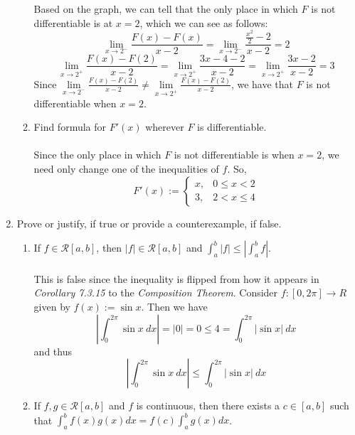 \documentclass[12pt,letterpaper]{article}
\newcommand{\limx}[2]{\displaystyle\lim\limits_{#1 \to #2}}
\newcommand{\abs}[1]{\left\lvert #1 \right\rvert}
\theoremstyle{case}
\theoremstyle{definition}
\begin{document}
\begin{enumerate}
\begin{enumerate}
			\\\\Based on the graph, we can tell that the only place in which $F$ is not differentiable is at $x=2$, which we can see as follows:
			\[\limx{x}{2^-} \frac{F(x)-F(x)}{x-2} = \limx{x}{2^-} \frac{\frac{x^2}{2}-2}{x-2}=2\]
			\[\limx{x}{2^+}\frac{F(x)-F(2)}{x-2}=\limx{x}{2^+} \frac{3x-4-2}{x-2}=\limx{x}{2^+} \frac{3x-2}{x-2} = 3\]
			Since $\limx{x}{2^-} \frac{F(x)-F(2)}{x-2} \neq \limx{x}{2^+} \frac{F(x)-F(2)}{x-2}$, we have that $F$ is not differentiable when $x=2$.\\
			\item Find formula for $F'(x)$ wherever $F$ is differentiable.
			\\\\Since the only place in which $F$ is not differentiable is when $x=2$, we need only change one of the inequalities of $f$. So,
			\[F'(x):=\begin{cases}
			x, &0 \leq x < 2 \\
			3, &2<x\leq 4
			\end{cases}\]
		\end{enumerate}
		\item Prove or justify, if true or provide a counterexample, if false.
		\begin{enumerate}
			\item If $f \in \mathcal{R}[a,b]$, then $|f| \in \mathcal{R}[a,b]$ and $\displaystyle\int_{a}^{b} |f| \leq \abs{\int_{a}^{b}f}$.
			\\\\This is false since the inequality is flipped from how it appears in \textit{Corollary 7.3.15} to the \textit{Composition Theorem}. Consider $f:[0,2\pi] \to R$ given by $f(x):=\sin x$. Then we have
			\[\abs{\int_{0}^{2\pi} \sin x\ dx} = \abs{0} = 0 \leq 4=\int_{0}^{2\pi} \abs{\sin x}\ dx\]
			and thus
			\[\abs{\int_{0}^{2\pi} \sin x\ dx} \leq \int_{0}^{2\pi} \abs{\sin x}\ dx\]
			\item If $f,g \in \mathcal{R}[a,b]$ and $f$ is continuous, then there exists a $c \in [a,b]$ such that $\displaystyle\int_{a}^{b}f(x)g(x)dx=f(c)\int_{a}^{b}g(x)dx$.

\end{enumerate}
\end{enumerate}
\end{document}
